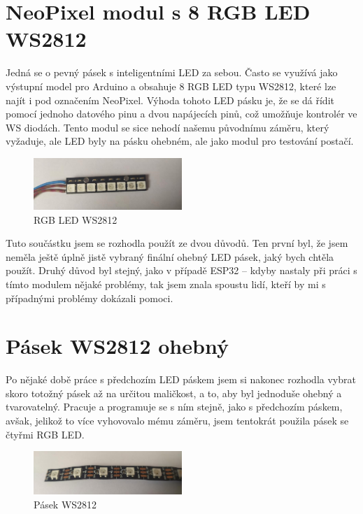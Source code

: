 \section{NeoPixel modul s 8 RGB LED WS2812}
Jedná se o pevný pásek s inteligentními LED za sebou. Často se využívá jako výstupní model pro Arduino a obsahuje 8 RGB LED typu WS2812, které lze najít i pod označením NeoPixel. Výhoda tohoto LED pásku je, že se dá řídit pomocí jednoho datového pinu a dvou napájecích pinů, což umožňuje kontrolér ve WS diodách. Tento modul se sice nehodí našemu původnímu záměru, který vyžaduje, ale LED byly na pásku ohebném, ale jako modul pro testování postačí.

\begin{figure}[htbp]
	\centering
	\includegraphics[width=0.5\textwidth]{img/NeoPixel2.jpg}
	\caption{RGB LED WS2812}
\end{figure}

Tuto součástku jsem se rozhodla použít ze dvou důvodů. Ten první byl, že jsem neměla ještě úplně jistě vybraný finální ohebný LED pásek, jaký bych chtěla použít. Druhý důvod byl stejný, jako v případě ESP32 -- kdyby nastaly při práci s tímto modulem nějaké problémy, tak jsem znala spoustu lidí, kteří by mi s případnými problémy dokázali pomoci. 

\newpage

\section{Pásek WS2812 ohebný}
Po nějaké době práce s předchozím LED páskem jsem si nakonec rozhodla vybrat skoro totožný pásek až na určitou maličkost, a to, aby byl jednoduše ohebný a tvarovatelný. Pracuje a programuje se s ním stejně, jako s předchozím páskem, avšak, jelikož to více vyhovovalo mému záměru, jsem tentokrát použila pásek se čtyřmi RGB LED. 


\begin{figure}[htbp]
	\centering
	\includegraphics[width=0.5\textwidth]{img/OhebnyLedPasek2.jpg}
	\caption{Pásek WS2812}
\end{figure}



